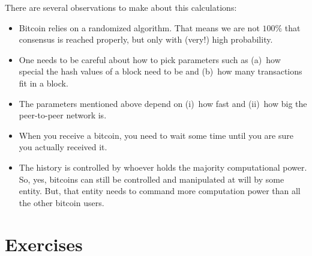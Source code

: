 There are several observations to make about this calculations:
\begin{itemize}
\item
  Bitcoin relies on a randomized algorithm.
  That means we are not $100\%$ that consensus is reached properly, but only with (very!) high probability.
\item
  One needs to be careful about how to pick parameters such as (a)~how special the hash values of a block need to be and (b)~how many transactions fit in a block.
\item
  The parameters mentioned above depend on (i)~how fast and (ii)~how big the peer-to-peer network is.
\item
  When you receive a bitcoin, you need to wait some time until you are sure you actually received it.
\item
  The history is controlled by whoever holds the majority computational power.
  So, yes, bitcoins can still be controlled and manipulated at will by some entity.
  But, that entity needs to command more computation power than all the other bitcoin users.
\end{itemize}


\section{Exercises}

